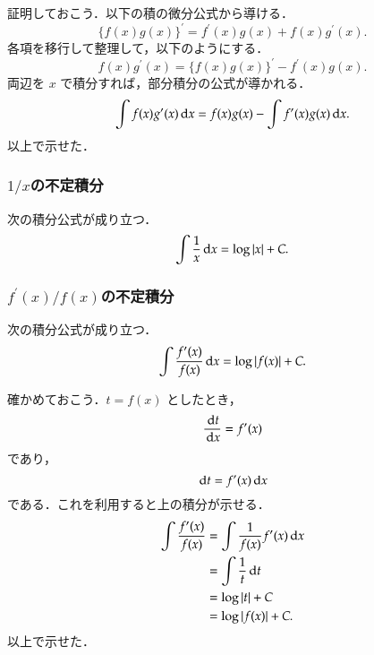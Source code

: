         証明しておこう．以下の積の微分公式から導ける．
        \[
            \{ f(x)g(x) \}^{\prime} = f^{\prime}(x)g(x) + f(x)g^{\prime}(x).
        \]
        各項を移行して整理して，以下のようにする．
        \[
            f(x)g^{\prime}(x) = \{ f(x)g(x) \}^{\prime} - f^{\prime}(x)g(x).
        \]
        両辺を $x$ で積分すれば，部分積分の公式が導かれる．
        \[
            \int f(x)g^{\prime}(x) \,\mathrm{d} x= f(x)g(x) - \int f^{\prime}(x)g(x) \,\mathrm{d} x.
        \]
        以上で示せた．

        \subsubsection{$1/x$の不定積分}
        次の積分公式が成り立つ．
        \begin{align}
            \int \frac{1}{x} \,\mathrm{d} x= \log |x| + C.
        \end{align}

        \subsubsection{$f^{\prime}(x)/f(x)$の不定積分}
        次の積分公式が成り立つ．
        \begin{align}
            \int \frac{f^{\prime}(x)}{f(x)} \,\mathrm{d} x= \log |f(x)| + C.
        \end{align}

        確かめておこう．$t=f(x)$ としたとき，
        \[
            \frac{\,\mathrm{d} t}{\,\mathrm{d} x} = f^{\prime}(x)
        \]
        であり，
        \[
            \,\mathrm{d} t = f^{\prime}(x) \,\mathrm{d} x
        \]
        である．これを利用すると上の積分が示せる．
        \begin{align*}
            \int \frac{f^{\prime}(x)}{f(x)} &= \int \frac{1}{f(x)} f^{\prime}(x) \,\mathrm{d} x \\
                                            &= \int \frac{1}{t} \,\mathrm{d} t \\
                                            &= \log |t| + C \\
                                            &= \log |f(x)| + C.
        \end{align*}
        以上で示せた．


